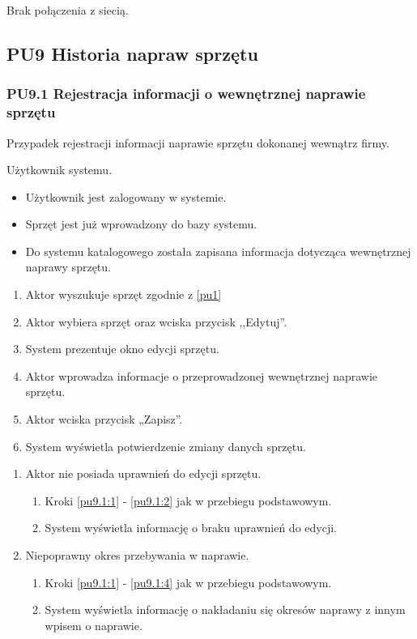 Brak połączenia z siecią.

\subsection{PU9 Historia napraw sprzętu} \label{pu9}
\subsubsection{PU9.1 Rejestracja informacji o wewnętrznej naprawie sprzętu}
Przypadek rejestracji informacji naprawie sprzętu dokonanej wewnątrz firmy.

Użytkownik systemu.

\begin{itemize}
\item Użytkownik jest zalogowany w systemie.
\item Sprzęt jest już wprowadzony do bazy systemu.
\end{itemize}

\begin{itemize}
\item Do systemu katalogowego została zapisana informacja dotycząca wewnętrznej naprawy sprzętu.
\end{itemize}

\begin{enumerate}
	\item \label{pu9.1:1} Aktor wyszukuje sprzęt zgodnie z \ref{pu1}
	\item \label{pu9.1:2} Aktor wybiera sprzęt oraz wciska przycisk ,,Edytuj''.
	\item System prezentuje okno edycji sprzętu.
	\item \label{pu9.1:4} Aktor wprowadza informacje o przeprowadzonej wewnętrznej naprawie sprzętu.
	\item Aktor wciska przycisk „Zapisz”.
	\item System wyświetla potwierdzenie zmiany danych sprzętu.
\end{enumerate}

\begin{enumerate}
	\item Aktor nie posiada uprawnień do edycji sprzętu.
	\begin{enumerate}[label*=\arabic*.]
		\item Kroki \ref{pu9.1:1} - \ref{pu9.1:2} jak w przebiegu podstawowym.
		\item System wyświetla informację o braku uprawnień do edycji.
	\end{enumerate}
	\item Niepoprawny okres przebywania w naprawie.
	\begin{enumerate}[label*=\arabic*.]
		\item Kroki \ref{pu9.1:1} - \ref{pu9.1:4} jak w przebiegu podstawowym.
		\item System wyświetla informację o nakładaniu się okresów naprawy z innym wpisem o naprawie.
	\end{enumerate}
\end{enumerate}

